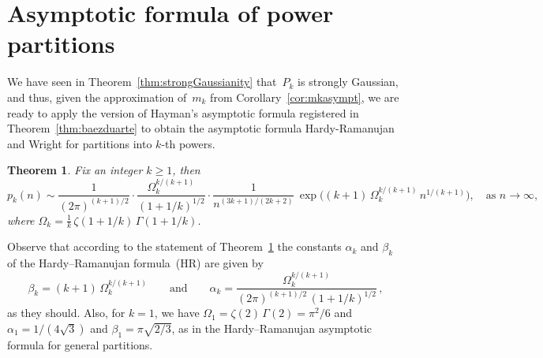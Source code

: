 \documentclass[12pt]{amsart}
\newtheorem{theoremL}{Theorem}
\theoremstyle{definition}
\begin{document}
\section{Asymptotic formula of power partitions}\label{sec:asymptotic}

We have seen in Theorem~\ref{thm:strongGaussianity} that~$P_k$ is strongly Gaussian, and thus, given the approximation of~$m_k$ from Corollary~\ref{cor:mkasympt},  we are ready to apply the version of Hayman's asymptotic
formula registered in Theorem~\ref{thm:baezduarte} to obtain the asymptotic formula Hardy-Ramanujan and Wright for partitions into
$k$-th powers.

\begin{theoremL}\label{thm:asymptotic of pk(n)}
Fix an integer $k\ge 1$, then
\[
p_k(n) \sim \frac{1}{(2\pi)^{(k+1)/2}} \cdot \frac{\Omega_k^{k/(k+1)}}{(1+1/k)^{1/2}} \cdot \frac{1}{n^{(3k+1)/(2k+2)}}\, \exp\!\Big((k+1)\,\Omega_k^{k/(k+1)}\, n^{1/(k+1)}\Big), \quad \text{as } n\to\infty,
\]
where $\Omega_k = \frac{1}{k}\,\zeta(1+1/k)\,\Gamma(1+1/k)$.
\end{theoremL}

Observe that according to the statement of Theorem~\ref{thm:asymptotic of pk(n)} the constants $\alpha_k$ and $\beta_k$ of
the Hardy--Ramanujan formula~(HR) are given by
\[
\beta_k = (k+1)\,\Omega_k^{k/(k+1)} \qquad \text{and} \qquad \alpha_k = \frac{\Omega_k^{k/(k+1)}}{(2\pi)^{(k+1)/2}\,(1+1/k)^{1/2}}\,,
\]
as they should. Also, for $k=1$, we have $\Omega_1=\zeta(2)\,\Gamma(2)=\pi^2/6$ and $\alpha_1=1/(4\sqrt{3})$ and
$\beta_1=\pi\sqrt{2/3}$, as in the Hardy--Ramanujan asymptotic formula for general partitions.
\end{document}
